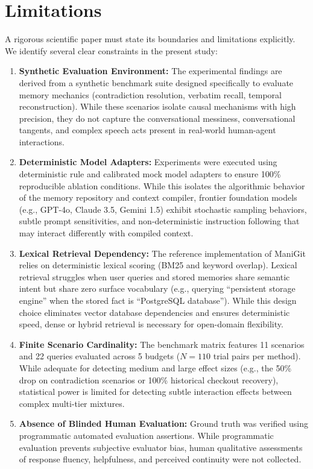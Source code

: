 \section{Limitations}
\label{sec:limitations}

A rigorous scientific paper must state its boundaries and limitations explicitly. We identify several clear constraints in the present study:

\begin{enumerate}
    \item \textbf{Synthetic Evaluation Environment:} The experimental findings are derived from a synthetic benchmark suite designed specifically to evaluate memory mechanics (contradiction resolution, verbatim recall, temporal reconstruction). While these scenarios isolate causal mechanisms with high precision, they do not capture the conversational messiness, conversational tangents, and complex speech acts present in real-world human-agent interactions.
    \item \textbf{Deterministic Model Adapters:} Experiments were executed using deterministic rule and calibrated mock model adapters to ensure 100\% reproducible ablation conditions. While this isolates the algorithmic behavior of the memory repository and context compiler, frontier foundation models (e.g., GPT-4o, Claude 3.5, Gemini 1.5) exhibit stochastic sampling behaviors, subtle prompt sensitivities, and non-deterministic instruction following that may interact differently with compiled context.
    \item \textbf{Lexical Retrieval Dependency:} The reference implementation of ManiGit relies on deterministic lexical scoring (BM25 and keyword overlap). Lexical retrieval struggles when user queries and stored memories share semantic intent but share zero surface vocabulary (e.g., querying ``persistent storage engine'' when the stored fact is ``PostgreSQL database''). While this design choice eliminates vector database dependencies and ensures deterministic speed, dense or hybrid retrieval is necessary for open-domain flexibility.
    \item \textbf{Finite Scenario Cardinality:} The benchmark matrix features 11 scenarios and 22 queries evaluated across 5 budgets ($N=110$ trial pairs per method). While adequate for detecting medium and large effect sizes (e.g., the 50\% drop on contradiction scenarios or 100\% historical checkout recovery), statistical power is limited for detecting subtle interaction effects between complex multi-tier mixtures.
    \item \textbf{Absence of Blinded Human Evaluation:} Ground truth was verified using programmatic automated evaluation assertions. While programmatic evaluation prevents subjective evaluator bias, human qualitative assessments of response fluency, helpfulness, and perceived continuity were not collected.

\end{enumerate}
